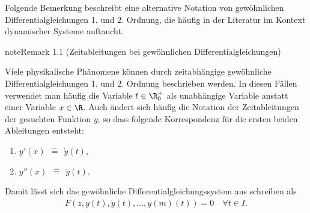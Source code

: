 \documentclass[letterpaper,10pt,english]{jupyterBook}
\begin{document}
\sphinxAtStartPar
Folgende Bemerkung beschreibt eine alternative Notation von gewöhnlichen Differentialgleichungen 1. und 2. Ordnung, die häufig in der Literatur im Kontext dynamischer Systeme auftaucht.
\label{ode/repetition:remark-1}
\begin{sphinxadmonition}{note}{Remark 1.1 (Zeitableitungen bei gewöhnlichen Differentialgleichungen)}



\sphinxAtStartPar
Viele physikalische Phänomene können durch zeitabhängige gewöhnliche Differentialgleichungen 1. und 2. Ordnung beschrieben werden.
In diesen Fällen verwendet man häufig die Variable \(t \in \R^+_0\) als unabhängige Variable anstatt einer Variable \(x \in \R\).
Auch ändert sich häufig die Notation der Zeitableitungen der gesuchten Funktion \(y\), so dass folgende Korrespondenz für die ersten beiden Ableitungen entsteht:
\begin{enumerate}
%
\item {} 
\sphinxAtStartPar
\(y'(x) \ \ \hat{=} \ \ \dot{y}(t)\),

\item {} 
\sphinxAtStartPar
\(y''(x) \ \ \hat{=} \ \ \ddot{y}(t)\).

\end{enumerate}

\sphinxAtStartPar
Damit lässt sich das gewöhnliche Differentialgleichungssystem aus {\hyperref[\detokenize{ode/repetition:equation-eq-dgl}]{}} schreiben als
\begin{equation}\label{equation:ode/repetition:eq:DGL_time}
\begin{split}F(z, y(t), \dot{y}(t), \ldots, y{(m)}(t)) = 0 \quad \forall t\in I.\end{split}
\end{equation}\end{sphinxadmonition}
\end{document}
